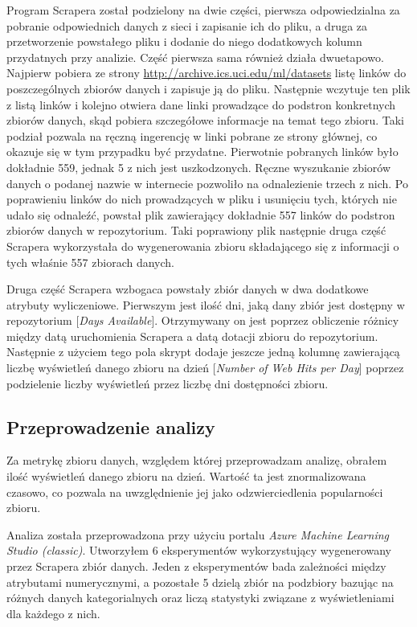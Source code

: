 Program Scrapera został podzielony na dwie części, pierwsza odpowiedzialna za pobranie odpowiednich danych z sieci i zapisanie ich do pliku, a druga za przetworzenie powstałego pliku i dodanie do niego dodatkowych kolumn przydatnych przy analizie.
Część pierwsza sama również działa dwuetapowo.
Najpierw pobiera ze strony \url{http://archive.ics.uci.edu/ml/datasets} listę linków do poszczególnych zbiorów danych i zapisuje ją do pliku.
Następnie wczytuje ten plik z listą linków i kolejno otwiera dane linki prowadzące do podstron konkretnych zbiorów danych, skąd pobiera szczegółowe informacje na temat tego zbioru.
Taki podział pozwala na ręczną ingerencję w linki pobrane ze strony głównej, co okazuje się w tym przypadku być przydatne.
Pierwotnie pobranych linków było dokładnie 559, jednak 5 z nich jest uszkodzonych.
Ręczne wyszukanie zbiorów danych o podanej nazwie w internecie pozwoliło na odnalezienie trzech z nich.
Po poprawieniu linków do nich prowadzących w pliku i usunięciu tych, których nie udało się odnaleźć, powstał plik zawierający dokładnie 557 linków do podstron zbiorów danych w repozytorium.
Taki poprawiony plik następnie druga część Scrapera wykorzystała do wygenerowania zbioru składającego się z informacji o tych właśnie 557 zbiorach danych.

Druga część Scrapera wzbogaca powstały zbiór danych w dwa dodatkowe atrybuty wyliczeniowe.
Pierwszym jest ilość dni, jaką dany zbiór jest dostępny w repozytorium [\emph{Days Available}].
Otrzymywany on jest poprzez obliczenie różnicy między datą uruchomienia Scrapera a datą dotacji zbioru do repozytorium.
Następnie z użyciem tego pola skrypt dodaje jeszcze jedną kolumnę zawierającą liczbę wyświetleń danego zbioru na dzień [\emph{Number of Web Hits per Day}] poprzez podzielenie liczby wyświetleń przez liczbę dni dostępności zbioru.

\subsection{Przeprowadzenie analizy}

Za metrykę zbioru danych, względem której przeprowadzam analizę, obrałem ilość wyświetleń danego zbioru na dzień.
Wartość ta jest znormalizowana czasowo, co pozwala na uwzględnienie jej jako odzwierciedlenia popularności zbioru.

Analiza została przeprowadzona przy użyciu portalu \emph{Azure Machine Learning Studio (classic)}.
Utworzyłem 6 eksperymentów wykorzystujący wygenerowany przez Scrapera zbiór danych.
Jeden z eksperymentów bada zależności między atrybutami numerycznymi, a pozostałe 5 dzielą zbiór na podzbiory bazując na różnych danych kategorialnych oraz liczą statystyki związane z wyświetleniami dla każdego z nich.

